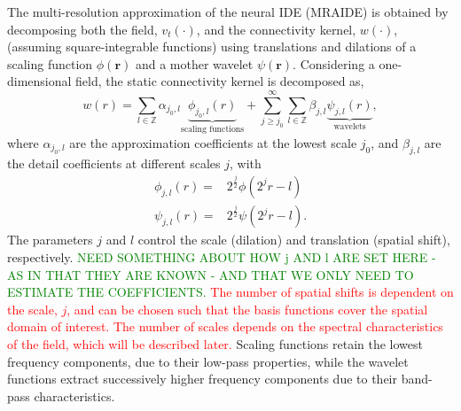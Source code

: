 \documentclass[review,authoryear,3p]{elsarticle}
\newcommand{\dean}[1]{\textcolor{green}{#1}}
\newcommand{\parham}[1]{\textcolor{red}{#1}}
\begin{document}
The multi-resolution approximation \citep{Mallat1989a} of the neural IDE (MRAIDE) is obtained by decomposing both the field, $v_t(\cdot)$, and the connectivity kernel, $w(\cdot)$, (assuming square-integrable functions) using translations and dilations of a scaling function $\phi(\mathbf{r})$ and a mother wavelet $\psi(\mathbf{r})$. Considering a  one-dimensional field, the static connectivity kernel is decomposed as,
\begin{equation}
 w\left(r\right)=\sum_{l\in \mathbb{Z}}\alpha_{j_0,l} \underbrace{\phi_{j_0,l}\left(r\right)}_{\text{scaling functions}} + \sum_{j\geq j_0}^{\infty} \sum_{l \in \mathbb{Z}}\beta_{j,l} \underbrace{\psi_{j,l}\left(r\right)}_{\text{wavelets}}, 
\label{eq:KernelExpansion}
\end{equation}
where $\alpha_{j_0,l}$ are the approximation coefficients at the lowest scale $j_0$, and $\beta_{j,l}$ are the detail coefficients at different scales $j$, with
\begin{align}
\phi_{j,l}\left(r\right) =& 2^{\frac{j}{2}}\phi\left(2^j r-l\right) \\	
\psi_{j,l}\left(r\right) =& 2^{\frac{j}{2}}\psi\left(2^j r-l\right).
\end{align}
The parameters $j$ and $l$ control the scale (dilation) and translation (spatial shift), respectively. \dean{NEED SOMETHING ABOUT HOW j AND l ARE SET HERE - AS IN THAT THEY ARE KNOWN - AND THAT WE ONLY NEED TO ESTIMATE THE COEFFICIENTS.} \parham{The number of spatial shifts is dependent on the scale, $j$, and can be chosen such that the basis functions cover the spatial domain of interest. The number of scales depends on the spectral characteristics of the field, which will be described later.} Scaling functions retain the lowest frequency components, due to their low-pass properties, while the wavelet functions extract successively higher frequency components due to their band-pass characteristics. 
\end{document}

